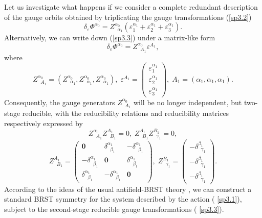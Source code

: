 \documentclass[a4paper,12pt]{article}
\begin{document}
Let us investigate what happens if we consider a complete redundant
description of the gauge orbits obtained by triplicating the gauge
transformations (\ref{sp3.2}) 
\begin{equation}
\delta _{\varepsilon }\Phi ^{\alpha _{0}}=Z_{\;\;\alpha _{1}}^{\alpha
_{0}}\left( \varepsilon _{1}^{\alpha _{1}}+\varepsilon _{2}^{\alpha
_{1}}+\varepsilon _{3}^{\alpha _{1}}\right) .  \label{sp3.3}
\end{equation}
Alternatively, we can write down (\ref{sp3.3}) under a matrix-like form 
\begin{equation}
\delta _{\varepsilon }\Phi ^{\alpha _{0}}=Z_{\;\;A_{1}}^{\alpha
_{0}}\varepsilon ^{A_{1}},  \label{sp3.4}
\end{equation}
where 
\begin{equation}
Z_{\;\;A_{1}}^{\alpha _{0}}=\left( Z_{\;\;\alpha _{1}}^{\alpha
_{0}},Z_{\;\;\alpha _{1}}^{\alpha _{0}},Z_{\;\;\alpha _{1}}^{\alpha
_{0}}\right) ,\;\varepsilon ^{A_{1}}=\left( 
\begin{array}{c}
\varepsilon _{1}^{\alpha _{1}} \\ 
\varepsilon _{2}^{\alpha _{1}} \\ 
\varepsilon _{3}^{\alpha _{1}}
\end{array}
\right) ,\;A_{1}=\left( \alpha _{1},\alpha _{1},\alpha _{1}\right) .
\label{sp3.5}
\end{equation}
Consequently, the gauge generators $Z_{\;\;A_{1}}^{\alpha _{0}}$ will be no
longer independent, but two-stage reducible, with the reducibility relations
and reducibility matrices respectively expressed by 
\begin{equation}
Z_{\;\;A_{1}}^{\alpha
_{0}}Z_{\;\;B_{1}}^{A_{1}}=0,\;Z_{\;\;B_{1}}^{A_{1}}Z_{\;\;\gamma
_{1}}^{B_{1}}=0,  \label{sp3.6}
\end{equation}
\begin{equation}
Z_{\;\;B_{1}}^{A_{1}}=\left( 
\begin{array}{ccc}
\mathbf{0} & \delta _{\;\;\beta _{1}}^{\alpha _{1}} & -\delta _{\;\;\beta
_{1}}^{\alpha _{1}} \\ 
-\delta _{\;\;\beta _{1}}^{\alpha _{1}} & \mathbf{0} & \delta _{\;\;\beta
_{1}}^{\alpha _{1}} \\ 
\delta _{\;\;\beta _{1}}^{\alpha _{1}} & -\delta _{\;\;\beta _{1}}^{\alpha
_{1}} & \mathbf{0}
\end{array}
\right) ,\;Z_{\;\;\gamma _{1}}^{B_{1}}=\left( 
\begin{array}{c}
-\delta _{\;\;\gamma _{1}}^{\beta _{1}} \\ 
-\delta _{\;\;\gamma _{1}}^{\beta _{1}} \\ 
-\delta _{\;\;\gamma _{1}}^{\beta _{1}}
\end{array}
\right) .  \label{sp3.7}
\end{equation}
According to the ideas of the usual antifield-BRST theory \cite{12}, we can
construct a standard BRST symmetry for the system described by the action (%
\ref{sp3.1}), subject to the second-stage reducible gauge transformations (%
\ref{sp3.3}).
\end{document}
